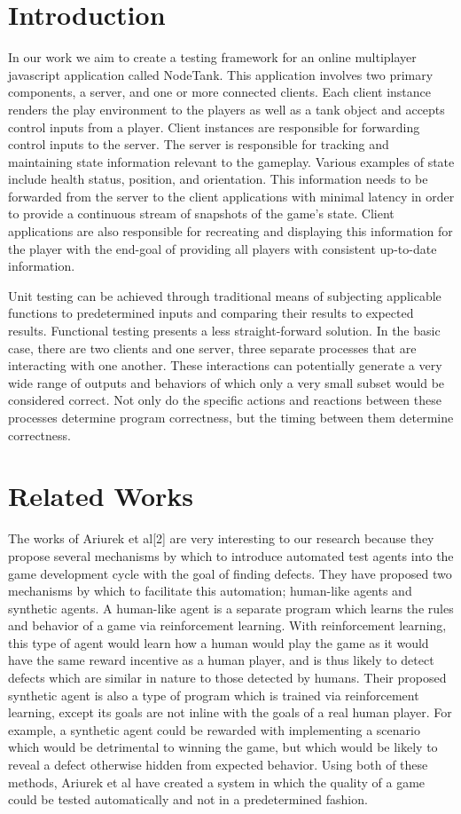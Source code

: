 \documentclass[conference]{IEEEtran}
\begin{document}
\section{Introduction}
In our work we aim to create a testing framework for an online multiplayer javascript application called NodeTank. This application involves two primary components,
a server, and one or more connected clients. Each client instance renders the play environment to the players as well as a tank object and accepts control inputs from
a player. Client instances are responsible for forwarding control inputs to the server. The server is responsible for tracking and maintaining state information relevant
to the gameplay. Various examples of state include health status, position, and orientation. This information needs to be forwarded from the server to the client applications
with minimal latency in order to provide a continuous stream of snapshots of the game’s state. Client applications are also responsible for recreating and displaying this
information for the player with the end-goal of providing all players with consistent up-to-date information.

Unit testing can be achieved through traditional means of subjecting applicable functions to predetermined inputs and comparing their results to expected results.
Functional testing presents a less straight-forward solution. In the basic case, there are two clients and one server, three separate processes that are interacting
with one another. These interactions can potentially generate a very wide range of outputs and behaviors of which only a very small subset would be
considered correct. Not only do the specific actions and reactions between these processes determine program correctness, but the timing between them determine correctness.

\section{Related Works}

The works of Ariurek et al[2] are very interesting to our research because they propose several mechanisms by which to introduce automated test agents into the game
development cycle with the goal of finding defects. They have proposed two mechanisms by which to facilitate this automation; human-like agents and synthetic agents.
A human-like agent is a separate program which learns the rules and behavior of a game via reinforcement learning. With reinforcement learning, this type of agent would
learn how a human would play the game as it would have the same reward incentive as a human player, and is thus likely to detect defects which are similar in nature to those
detected by humans. Their proposed synthetic agent is also a type of program which is trained via reinforcement learning, except its goals are not inline with the goals of a
real human player. For example, a synthetic agent could be rewarded with implementing a scenario which would be detrimental to winning the game, but which would be likely to
reveal a defect otherwise hidden from expected behavior. Using both of these methods, Ariurek et al have created a system in which the quality of a game could be tested automatically
and not in a predetermined fashion.
\end{document}
